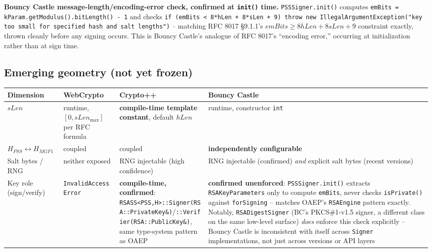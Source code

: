 \documentclass[11pt,a4paper]{article}
\begin{document}
\textbf{Bouncy Castle message-length/encoding-error check, confirmed at \texttt{init()} time.} \texttt{PSSSigner.init()} computes \texttt{emBits = kParam.getModulus().bitLength() - 1} and checks \texttt{if (emBits < 8*hLen + 8*sLen + 9) throw new IllegalArgumentException("key too small for specified hash and salt lengths")} -- matching RFC 8017 \S9.1.1's $emBits \ge 8hLen+8sLen+9$ constraint exactly, thrown cleanly before any signing occurs. This is Bouncy Castle's analogue of RFC 8017's ``encoding error,'' occurring at initialization rather than at sign time.

\subsection{Emerging geometry (not yet frozen)}
\begin{center}
\begin{tabularx}{\textwidth}{@{}l>{\raggedright\arraybackslash}X>{\raggedright\arraybackslash}X>{\raggedright\arraybackslash}X@{}}
\toprule
Dimension & WebCrypto & Crypto++ & Bouncy Castle \\
\midrule
$sLen$ & runtime, $[0, sLen_{\max}]$ per RFC formula & \textbf{compile-time template constant}, default $hLen$ & runtime, constructor \texttt{int} \\
$H_{PSS} \leftrightarrow H_{MGF1}$ & coupled & coupled & \textbf{independently configurable} \\
Salt bytes / RNG & neither exposed & RNG injectable (high confidence) & RNG injectable (confirmed) \emph{and} explicit salt bytes (recent versions) \\
Key role (sign/verify) & \texttt{InvalidAccessError} & \textbf{compile-time, confirmed}: \texttt{RSASS<PSS,H>::Signer(RSA::PrivateKey\&)}/\texttt{::Verifier(RSA::PublicKey\&)}, same type-system pattern as OAEP & \textbf{confirmed unenforced}: \texttt{PSSSigner.init()} extracts \texttt{RSAKeyParameters} only to compute \texttt{emBits}, never checks \texttt{isPrivate()} against \texttt{forSigning} -- matches OAEP's \texttt{RSAEngine} pattern exactly. Notably, \texttt{RSADigestSigner} (BC's PKCS\#1-v1.5 signer, a different class on the same low-level surface) \emph{does} enforce this check explicitly -- Bouncy Castle is inconsistent with itself across \texttt{Signer} implementations, not just across versions or API layers \\

\end{tabularx}
\end{center}
\end{document}
